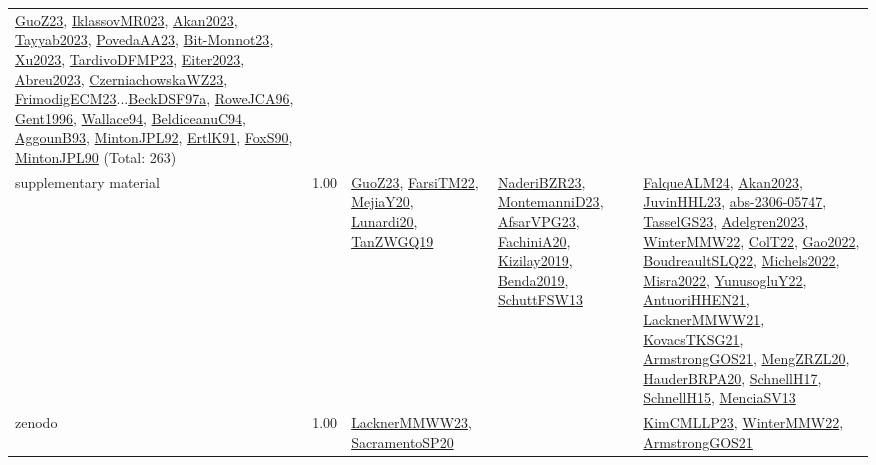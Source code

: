 {\begin{longtable}{p{3cm}r>{\raggedright\arraybackslash}p{6cm}>{\raggedright\arraybackslash}p{6cm}>{\raggedright\arraybackslash}p{8cm}}
\hyperref[detail:GuoZ23]{GuoZ23}, \hyperref[detail:IklassovMR023]{IklassovMR023}, \hyperref[detail:Akan2023]{Akan2023}, \hyperref[detail:Tayyab2023]{Tayyab2023}, \hyperref[detail:PovedaAA23]{PovedaAA23}, \hyperref[detail:Bit-Monnot23]{Bit-Monnot23}, \hyperref[detail:Xu2023]{Xu2023}, \hyperref[detail:TardivoDFMP23]{TardivoDFMP23}, \hyperref[detail:Eiter2023]{Eiter2023}, \hyperref[detail:Abreu2023]{Abreu2023}, \hyperref[detail:CzerniachowskaWZ23]{CzerniachowskaWZ23}, \hyperref[detail:FrimodigECM23]{FrimodigECM23}...\hyperref[detail:BeckDSF97a]{BeckDSF97a}, \hyperref[detail:RoweJCA96]{RoweJCA96}, \hyperref[detail:Gent1996]{Gent1996}, \hyperref[detail:Wallace94]{Wallace94}, \hyperref[detail:BeldiceanuC94]{BeldiceanuC94}, \hyperref[detail:AggounB93]{AggounB93}, \hyperref[detail:MintonJPL92]{MintonJPL92}, \hyperref[detail:ErtlK91]{ErtlK91}, \hyperref[detail:FoxS90]{FoxS90}, \hyperref[detail:MintonJPL90]{MintonJPL90} (Total: 263)\\
\index{supplementary material}\index{Benchmarks!supplementary material}supplementary material &  1.00 & \hyperref[detail:GuoZ23]{GuoZ23}, \hyperref[detail:FarsiTM22]{FarsiTM22}, \hyperref[detail:MejiaY20]{MejiaY20}, \hyperref[detail:Lunardi20]{Lunardi20}, \hyperref[detail:TanZWGQ19]{TanZWGQ19} & \hyperref[detail:NaderiBZR23]{NaderiBZR23}, \hyperref[detail:MontemanniD23]{MontemanniD23}, \hyperref[detail:AfsarVPG23]{AfsarVPG23}, \hyperref[detail:FachiniA20]{FachiniA20}, \hyperref[detail:Kizilay2019]{Kizilay2019}, \hyperref[detail:Benda2019]{Benda2019}, \hyperref[detail:SchuttFSW13]{SchuttFSW13} & \hyperref[detail:FalqueALM24]{FalqueALM24}, \hyperref[detail:Akan2023]{Akan2023}, \hyperref[detail:JuvinHHL23]{JuvinHHL23}, \hyperref[detail:abs-2306-05747]{abs-2306-05747}, \hyperref[detail:TasselGS23]{TasselGS23}, \hyperref[detail:Adelgren2023]{Adelgren2023}, \hyperref[detail:WinterMMW22]{WinterMMW22}, \hyperref[detail:ColT22]{ColT22}, \hyperref[detail:Gao2022]{Gao2022}, \hyperref[detail:BoudreaultSLQ22]{BoudreaultSLQ22}, \hyperref[detail:Michels2022]{Michels2022}, \hyperref[detail:Misra2022]{Misra2022}, \hyperref[detail:YunusogluY22]{YunusogluY22}, \hyperref[detail:AntuoriHHEN21]{AntuoriHHEN21}, \hyperref[detail:LacknerMMWW21]{LacknerMMWW21}, \hyperref[detail:KovacsTKSG21]{KovacsTKSG21}, \hyperref[detail:ArmstrongGOS21]{ArmstrongGOS21}, \hyperref[detail:MengZRZL20]{MengZRZL20}, \hyperref[detail:HauderBRPA20]{HauderBRPA20}, \hyperref[detail:SchnellH17]{SchnellH17}, \hyperref[detail:SchnellH15]{SchnellH15}, \hyperref[detail:MenciaSV13]{MenciaSV13}\\
\index{zenodo}\index{Benchmarks!zenodo}zenodo &  1.00 & \hyperref[detail:LacknerMMWW23]{LacknerMMWW23}, \hyperref[detail:SacramentoSP20]{SacramentoSP20} &  & \hyperref[detail:KimCMLLP23]{KimCMLLP23}, \hyperref[detail:WinterMMW22]{WinterMMW22}, \hyperref[detail:ArmstrongGOS21]{ArmstrongGOS21}\\
\end{longtable}
}

